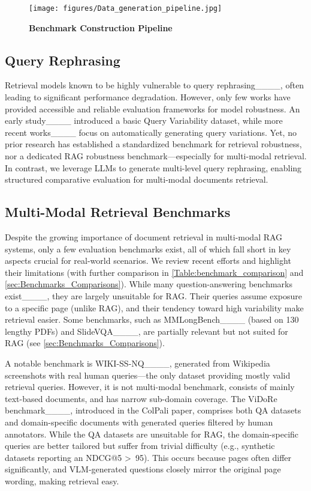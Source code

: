 \begin{figure*}[t]
    \centering
    \texttt{[image: figures/Data\_generation\_pipeline.jpg]} %
    \caption{\textbf{Benchmark Construction Pipeline}}
    \label{fig:Data_generation_pipeline} 
\end{figure*}

\subsection{Query Rephrasing}

Retrieval models known to be highly vulnerable to query rephrasing____, often leading to significant performance degradation. However, only few works have provided accessible and reliable evaluation frameworks for model robustness. An early study____ introduced a basic Query Variability dataset, while more recent works____ focus on automatically generating query variations. Yet, no prior research has established a standardized benchmark for retrieval robustness, nor a dedicated RAG robustness benchmark—especially for multi-modal retrieval. In contrast, we leverage LLMs to generate multi-level query rephrasing, enabling structured comparative evaluation for multi-modal documents retrieval.


\subsection{Multi-Modal Retrieval Benchmarks}

Despite the growing importance of document retrieval in multi-modal RAG systems, only a few evaluation benchmarks exist, all of which fall short in key aspects crucial for real-world scenarios. We review recent efforts and highlight their limitations (with further comparison in \cref{Table:benchmark_comparison} and \cref{sec:Benchmarks_Comparisons}).
While many question-answering benchmarks exist____, they are largely unsuitable for RAG. Their queries assume exposure to a specific page (unlike RAG), and their tendency toward high variability make retrieval easier. Some benchmarks, such as MMLongBench____ (based on 130 lengthy PDFs) and SlideVQA____, are partially relevant but not suited for RAG (see \cref{sec:Benchmarks_Comparisons}).

\vspace{0.1cm}
\noindent
A notable benchmark is WIKI-SS-NQ____, generated from Wikipedia screenshots with real human queries—the only dataset providing mostly valid retrieval queries. However, it is not multi-modal benchmark, consists of mainly text-based documents, and has narrow sub-domain coverage.
The ViDoRe benchmark____, introduced in the ColPali paper, comprises both QA datasets and domain-specific documents with generated queries filtered by human annotators. While the QA datasets are unsuitable for RAG, the domain-specific queries are better tailored but suffer from trivial difficulty (e.g., synthetic datasets reporting an NDCG@5 >~95). This occurs because pages often differ significantly, and VLM-generated questions closely mirror the original page wording, making retrieval easy.

